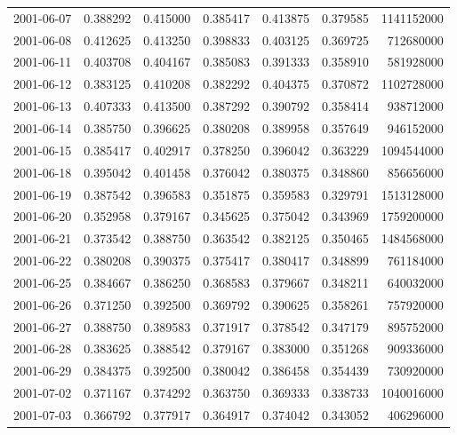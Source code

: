 \begin{tabular}{lrrrrrr}
2001-06-07 &    0.388292 &    0.415000 &    0.385417 &    0.413875 &    0.379585 &  1141152000 \\
2001-06-08 &    0.412625 &    0.413250 &    0.398833 &    0.403125 &    0.369725 &   712680000 \\
2001-06-11 &    0.403708 &    0.404167 &    0.385083 &    0.391333 &    0.358910 &   581928000 \\
2001-06-12 &    0.383125 &    0.410208 &    0.382292 &    0.404375 &    0.370872 &  1102728000 \\
2001-06-13 &    0.407333 &    0.413500 &    0.387292 &    0.390792 &    0.358414 &   938712000 \\
2001-06-14 &    0.385750 &    0.396625 &    0.380208 &    0.389958 &    0.357649 &   946152000 \\
2001-06-15 &    0.385417 &    0.402917 &    0.378250 &    0.396042 &    0.363229 &  1094544000 \\
2001-06-18 &    0.395042 &    0.401458 &    0.376042 &    0.380375 &    0.348860 &   856656000 \\
2001-06-19 &    0.387542 &    0.396583 &    0.351875 &    0.359583 &    0.329791 &  1513128000 \\
2001-06-20 &    0.352958 &    0.379167 &    0.345625 &    0.375042 &    0.343969 &  1759200000 \\
2001-06-21 &    0.373542 &    0.388750 &    0.363542 &    0.382125 &    0.350465 &  1484568000 \\
2001-06-22 &    0.380208 &    0.390375 &    0.375417 &    0.380417 &    0.348899 &   761184000 \\
2001-06-25 &    0.384667 &    0.386250 &    0.368583 &    0.379667 &    0.348211 &   640032000 \\
2001-06-26 &    0.371250 &    0.392500 &    0.369792 &    0.390625 &    0.358261 &   757920000 \\
2001-06-27 &    0.388750 &    0.389583 &    0.371917 &    0.378542 &    0.347179 &   895752000 \\
2001-06-28 &    0.383625 &    0.388542 &    0.379167 &    0.383000 &    0.351268 &   909336000 \\
2001-06-29 &    0.384375 &    0.392500 &    0.380042 &    0.386458 &    0.354439 &   730920000 \\
2001-07-02 &    0.371167 &    0.374292 &    0.363750 &    0.369333 &    0.338733 &  1040016000 \\
2001-07-03 &    0.366792 &    0.377917 &    0.364917 &    0.374042 &    0.343052 &   406296000 \\

\end{tabular}
